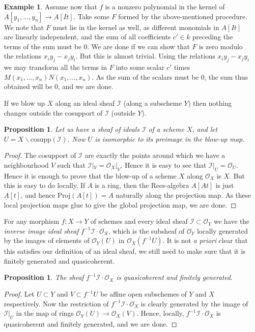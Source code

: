 \documentclass[12pt,a4paper,leqno]{article}
\newcommand{\OO}{\mathcal{O}}
\newcommand{\proj}{\mathrm{Proj}}
\newcommand{\cosupp}{\mathrm{cosupp}}
\theoremstyle{plain}
\newtheorem{prop}[theo]{Proposition}
\theoremstyle{definition}
\newtheorem{ex}[theo]{Example}
\theoremstyle{remark}
\begin{document}
\begin{ex}
Assume now that $f$ is a nonzero polynomial in the kernel of $A[y_1,...,y_n] \to A[It]$. Take some $F$ formed by the above-mentioned procedure. We note that $F$ must lie in the kernel as well, as different monomials in $A[It]$ are linearly independent, and the sum of all coefficients $c' \in k$ preceding the terms of the sum must be 0. We are done if we can show that $F$ is zero modulo the relations $x_i y_j - x_j y_i$. But this is almost trivial. Using the relations $x_i y_j - x_j y_i$ we may transform all the terms in $F$ into some scalar $c'$ times $M(x_1,...,x_n)N(x_1,...,x_n)$. As the sum of the scalars must be 0, the sum thus obtained will be 0, and we are done.
\end{ex}

If we blow up $X$ along an ideal sheaf $\mathscr{I}$ (along a subscheme $Y$) then nothing changes outside the cosupport of $\mathscr{I}$ (outside $Y$).

\begin{prop}
Let us have a sheaf of ideals $\mathscr{I}$ of a scheme $X$, and let $U = X \backslash \cosupp (\mathscr{I})$. Now $U$ is isomorphic to its preimage in the blow-up map. 
\end{prop}
\begin{proof}
The cosupport of $\mathscr{I}$ are exactly the points around which we have a neighbourhood $V$ such that $\mathscr{I} |_V  = \OO_X |_V$. Hence it is easy to see that $\mathscr{I}|_U = \OO_U$. Hence it is enough to prove that the blow-up of a scheme $X$ along $\OO_X$ is $X$. But this is easy to do locally. If $A$ is a ring, then the Rees-algebra $A[At]$ is just $A[t]$, and hence $\proj (A[t]) = A$ naturally along the projection map. As these local projection maps glue to give the global projection map, we are done.
\end{proof}

For any morphism $f: X \to Y$ of schemes and every ideal sheaf $\mathscr{I} \subset \OO_Y$ we have the \emph{inverse image ideal sheaf} $f^{-1} \mathscr{I} \cdot \OO_X$, which is the subsheaf of $\OO_Y$ locally generated by the images of elements of $\OO_Y (U)$ in $\OO_X (f^{-1} U)$. It is not \emph{a priori} clear that this satisfies our definition of an ideal sheaf, we still need to make sure that it is finitely generated and quasicoherent.

\begin{prop}
The sheaf $f^{-1} \mathscr{I} \cdot \OO_X$ is quasicoherent and finitely generated.
\end{prop}
\begin{proof}
Let $U \subset Y$ and $V \subset f^{-1}U$ be affine open subschemes of $Y$ and $X$ respectively. Now the restriction of $f^{-1} \mathscr{I} \cdot \OO_X$ is clearly generated by the image of $\mathscr{I}|_U$ in the map of rings $\OO_Y (U) \to \OO_X (V)$. Hence, locally, $f^{-1} \mathscr{I} \cdot \OO_X$ is quasicoherent and finitely generated, and we are done.
\end{proof}
\end{document}
